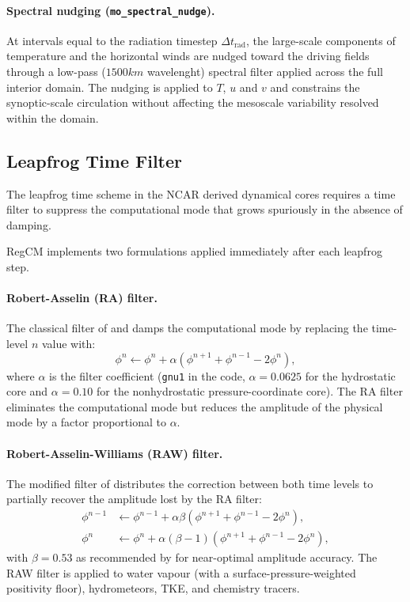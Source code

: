 {\paragraph{Spectral nudging (\texttt{mo\_spectral\_nudge}).}
At intervals equal to the radiation timestep $\Delta t_\mathrm{rad}$, the
large-scale components of temperature and the horizontal winds are nudged
toward the driving fields through a low-pass ($1500 km$ wavelenght) spectral
filter applied across the full interior domain.
The nudging is applied to $T$, $u$ and $v$ and constrains the synoptic-scale
circulation without affecting the mesoscale variability resolved within the
domain.

\subsection{Leapfrog Time Filter}

The leapfrog time scheme in the \ac{NCAR} derived dynamical cores
requires a time filter to suppress the computational mode that grows
spuriously in the absence of damping.

RegCM implements two formulations applied immediately after each leapfrog step.

\paragraph{Robert-Asselin (RA) filter.}
The classical filter of \citet{Robert_66} and \citet{Asselin_72} damps the
computational mode by replacing the time-level $n$ value with:
\begin{equation}
  \phi^n \leftarrow \phi^n + \alpha\left(\phi^{n+1} + \phi^{n-1}
    - 2\phi^n\right),
\end{equation}
where $\alpha$ is the filter coefficient (\texttt{gnu1} in the code,
$\alpha = 0.0625$ for the hydrostatic core and $\alpha = 0.10$ for the
nonhydrostatic pressure-coordinate core). The RA filter eliminates the
computational mode but reduces the amplitude of the physical mode by a factor
proportional to $\alpha$.

\paragraph{Robert-Asselin-Williams (RAW) filter.}
The modified filter of \citet{Williams_09} distributes the correction between
both time levels to partially recover the amplitude lost by the RA filter:
\begin{align}
  \phi^{n-1} &\leftarrow \phi^{n-1} + \alpha\beta
    \left(\phi^{n+1} + \phi^{n-1} - 2\phi^n\right), \\
  \phi^n     &\leftarrow \phi^n + \alpha(\beta-1)
    \left(\phi^{n+1} + \phi^{n-1} - 2\phi^n\right),
\end{align}
with $\beta = 0.53$ as recommended by \citet{Williams_09} for near-optimal
amplitude accuracy. The RAW filter is applied to water vapour (with a
surface-pressure-weighted positivity floor), hydrometeors, TKE, and chemistry
tracers.

}

